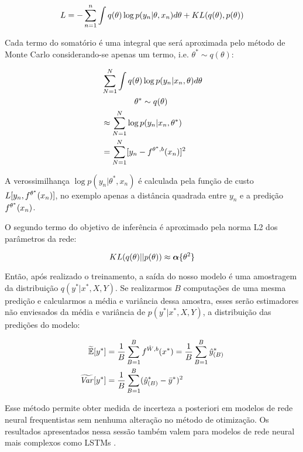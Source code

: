 \[
    \mathnormal{L} = - \sum^n_{n=1}\int{q(\theta)  \log p(y_n | \theta,x_n)}d\theta + \mathnormal{KL}(q(\theta),p(\theta))
\]


Cada termo do somatório é uma integral que será aproximada pelo método de Monte Carlo 
considerando-se apenas um termo, i.e. $\theta^* \sim q(\theta)$:

\begin{align*}
                    &\sum^N_{N=1} \int q(\theta) \log p(y_n | x_n,\theta)d\theta \\ 
                    &\qquad \qquad  \theta^* \sim q(\theta) \\
                    &\approx \sum^N_{N=1} \log p(y_n | x_n,\theta^*) \\
                    &= \sum^N_{N=1} [y_n - \mathnormal{f}^{\theta^*,b}(x_n)]^2
\end{align*}

A verossimilhança $\log p(y_n | \theta^*,x_n)$ é calculada pela
função de custo $L[y_n,\mathnormal{f}^{\theta^*}(x_n)]$, no exemplo apenas a distância quadrada
entre $y_n$ e a predição $\mathnormal{f}^{\theta^*}(x_n)$.

O segundo termo do objetivo de inferência é aproximado pela norma L2 dos
parâmetros da rede:

\begin{equation}
    \mathnormal{KL}(q(\theta) ||p(\theta)) \approx \boldsymbol{\alpha}\{\theta^2\}
 \end{equation} 

Então, após realizado o treinamento, a saída do nosso modelo é uma amostragem da
distribuição $q(y^* | x^*,X,Y)$. Se realizarmos $B$ computações de uma mesma
predição e calcularmos a média e variância dessa amostra, esses serão
estimadores não enviesados da média e variância de $p(y^*|x^*,X,Y)$, a
distribuição das predições do modelo:


\begin{align*}
  \label{eq:aproxs}
  \widetilde{\mathbb{E}}[y^*] &=
   \frac{1}{B}\sum^B_{B=1}\mathnormal{f}^{\hat{W},b}(x^*) = \frac{1}{B}\sum^B_{B=1}\hat{y}^*_{(B)}\\ 
   \widetilde{\mathit{Var}}[y^*]  &= \frac{1}{B}\sum^B_{B=1}(\hat{y}^*_{(B)} - \bar{y}^*)^2 
 \end{align*}


Esse método permite obter medida de incerteza a posteriori em modelos de rede
neural frequentistas sem nenhuma alteração no método de otimização.
Os resultados apresentados nessa sessão também valem para modelos de rede neural
mais complexos como LSTMs \citep{dropbayes}.
 

